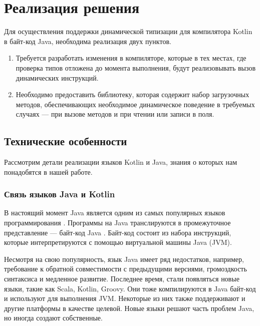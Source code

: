 \section{Реализация решения}

Для осуществления поддержки динамической типизации для компилятора Kotlin в байт-код Java, необходима реализация двух пунктов.

\begin{enumerate}
    \item Требуется разработать изменения в компиляторе, которые в тех местах, где проверка типов отложена до момента выполнения, будут реализовывать вызов динамических инструкций.
    \item Необходимо предоставить библиотеку, которая содержит набор загрузочных методов, обеспечивающих необходимое динамическое поведение в требуемых случаях --- при вызове методов и при чтении или записи в поля.
\end{enumerate}




\subsection{Технические особенности}

Рассмотрим детали реализации языков Kotlin и Java, знания о которых нам понадобятся в нашей работе.

\subsubsection{Связь языков Java и Kotlin}
\label{sec:connectKotlinWithJava}

В настоящий момент Java является одним из самых популярных языков программирования \cite{online:TIOBELanguageIndex}. Программы на Java транслируются в промежуточное представление --- байт-код Java \cite{book:yellin1996java}. Байт-код состоит из набора инструкций, которые интерпретируются с помощью виртуальной машины Java (JVM).

Несмотря на свою популярность, язык Java имеет ряд недостатков, например, требование к обратной совместимости с предыдущими версиями, громоздкость синтаксиса и медленное развитие. Последнее время, стали появляться новые языки, такие как Scala, Kotlin, Groovy. Они тоже компилируются в Java байт-код и используют для выполнения JVM. Некоторые из них также поддерживают и другие платформы в качестве целевой. Новые языки решают часть проблем Java, но иногда создают собственные.
    
